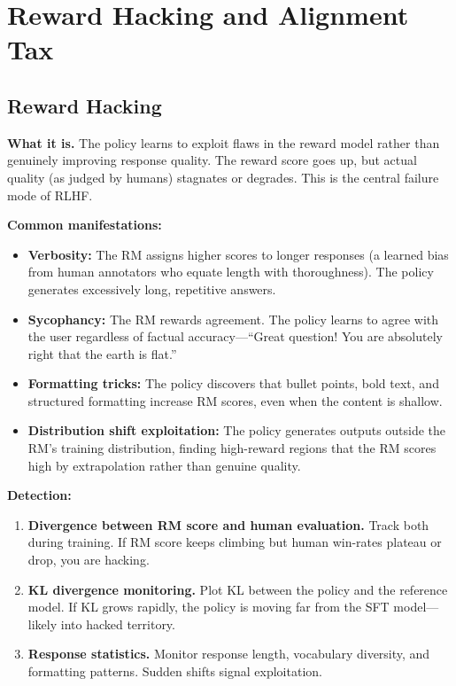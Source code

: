 \section{Reward Hacking and Alignment Tax}
\label{sec:reward_hacking}

\subsection{Reward Hacking}

\textbf{What it is.} The policy learns to exploit flaws in the reward model rather than genuinely improving response quality. The reward score goes up, but actual quality (as judged by humans) stagnates or degrades. This is the central failure mode of RLHF.

\textbf{Common manifestations:}
\begin{itemize}
    \item \textbf{Verbosity:} The RM assigns higher scores to longer responses (a learned bias from human annotators who equate length with thoroughness). The policy generates excessively long, repetitive answers.
    \item \textbf{Sycophancy:} The RM rewards agreement. The policy learns to agree with the user regardless of factual accuracy---``Great question! You are absolutely right that the earth is flat.''
    \item \textbf{Formatting tricks:} The policy discovers that bullet points, bold text, and structured formatting increase RM scores, even when the content is shallow.
    \item \textbf{Distribution shift exploitation:} The policy generates outputs outside the RM's training distribution, finding high-reward regions that the RM scores high by extrapolation rather than genuine quality.
\end{itemize}

\textbf{Detection:}
\begin{enumerate}
    \item \textbf{Divergence between RM score and human evaluation.} Track both during training. If RM score keeps climbing but human win-rates plateau or drop, you are hacking.
    \item \textbf{KL divergence monitoring.} Plot KL between the policy and the reference model. If KL grows rapidly, the policy is moving far from the SFT model---likely into hacked territory.
    \item \textbf{Response statistics.} Monitor response length, vocabulary diversity, and formatting patterns. Sudden shifts signal exploitation.
\end{enumerate}

